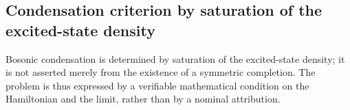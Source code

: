 \subsection{Condensation criterion by saturation of the excited-state density}
\label{v:rec:fock_gibbs:section:06}

Bosonic condensation is
determined by saturation of the excited-state density; it is not asserted
merely from the existence of a symmetric completion. The problem
is thus expressed by a verifiable mathematical condition on the
Hamiltonian and the limit, rather than by a nominal attribution.
